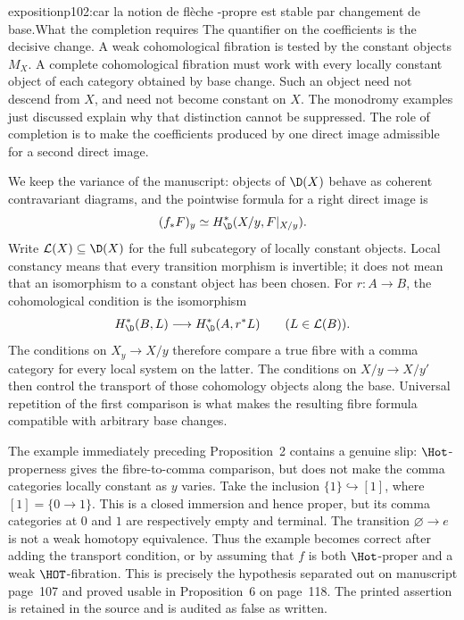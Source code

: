 \begin{dcomment}{exposition}{p102:car la notion de flèche \Hot-propre est stable par changement de base.}{What the completion requires}
The quantifier on the coefficients is the decisive change. A weak cohomological fibration is tested by the constant objects $M_X$. A complete cohomological fibration must work with every locally constant object of each category obtained by base change. Such an object need not descend from $X$, and need not become constant on $X$. The monodromy examples just discussed explain why that distinction cannot be suppressed. The role of completion is to make the coefficients produced by one direct image admissible for a second direct image.

We keep the variance of the manuscript: objects of $\D(X)$ behave as coherent contravariant diagrams, and the pointwise formula for a right direct image is
\[
 (f_*F)_y\simeq H^*_{\D}(X/y,F|_{X/y}).
\]
Write $\mathcal L(X)\subseteq\D(X)$ for the full subcategory of locally constant objects. Local constancy means that every transition morphism is invertible; it does not mean that an isomorphism to a constant object has been chosen. For $r:A\to B$, the cohomological condition is the isomorphism
\[
 H^*_{\D}(B,L)\longrightarrow H^*_{\D}(A,r^*L)
 \qquad(L\in\mathcal L(B)).
\]
The conditions on $X_y\to X/y$ therefore compare a true fibre with a comma category for every local system on the latter. The conditions on $X/y\to X/y'$ then control the transport of those cohomology objects along the base. Universal repetition of the first comparison is what makes the resulting fibre formula compatible with arbitrary base changes.

The example immediately preceding Proposition~2 contains a genuine slip: $\Hot$-properness gives the fibre-to-comma comparison, but does not make the comma categories locally constant as $y$ varies. Take the inclusion $\{1\}\hookrightarrow[1]$, where $[1]=\{0\to1\}$. This is a closed immersion and hence proper, but its comma categories at $0$ and $1$ are respectively empty and terminal. The transition $\varnothing\to e$ is not a weak homotopy equivalence. Thus the example becomes correct after adding the transport condition, or by assuming that $f$ is both $\Hot$-proper and a weak $\HOT$-fibration. This is precisely the hypothesis separated out on manuscript page~107 and proved usable in Proposition~6 on page~118. The printed assertion is retained in the source and is audited as false as written.
\end{dcomment}

